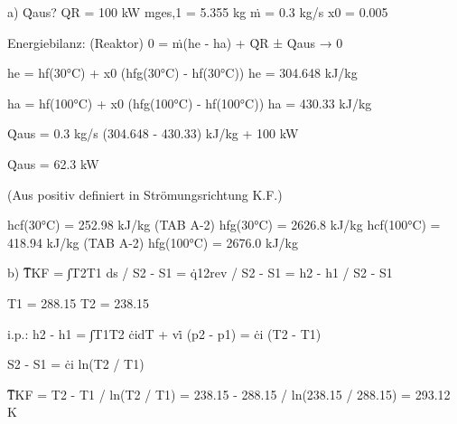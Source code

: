 a)  
Q̇aus?  
QR = 100 kW  
mges,1 = 5.355 kg  
ṁ = 0.3 kg/s  
x0 = 0.005  

Energiebilanz: (Reaktor)  
0 = ṁ(he - ha) + Q̇R ± Q̇aus → 0  

he = hf(30°C) + x0 (hfg(30°C) - hf(30°C))  
he = 304.648 kJ/kg  

ha = hf(100°C) + x0 (hfg(100°C) - hf(100°C))  
ha = 430.33 kJ/kg  

Q̇aus = 0.3 kg/s (304.648 - 430.33) kJ/kg + 100 kW  

Q̇aus = 62.3 kW  

(Aus positiv definiert in Strömungsrichtung K.F.)  

hcf(30°C) = 252.98 kJ/kg (TAB A-2)  
hfg(30°C) = 2626.8 kJ/kg  
hcf(100°C) = 418.94 kJ/kg (TAB A-2)  
hfg(100°C) = 2676.0 kJ/kg  

b)  
T̅KF = ∫T2T1 ds / S2 - S1 = q̇12rev / S2 - S1 = h2 - h1 / S2 - S1  

T1 = 288.15  
T2 = 238.15  

i.p.: h2 - h1 = ∫T1T2 ċidT + vi̇ (p2 - p1) = ċi (T2 - T1)  

S2 - S1 = ċi ln(T2 / T1)  

T̅KF = T2 - T1 / ln(T2 / T1) = 238.15 - 288.15 / ln(238.15 / 288.15) = 293.12 K